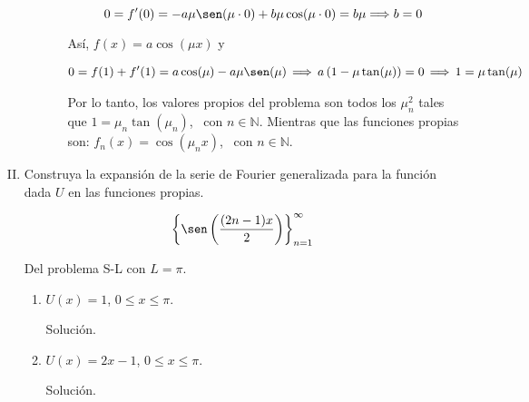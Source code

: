\documentclass[fleqn]{article}
\newcommand{\nat}{\mathbb{N}}
\begin{document}
\begin{enumerate}[I.]
\begin{enumerate}
\begin{enumerate}[i)]
				\begin{equation*}
					0 = f'(0) = -a \mu \sen(\mu \cdot 0) + b \mu \cos(\mu \cdot 0) = b \mu \Longrightarrow b = 0
				\end{equation*}

				Así, $ f(x) = a \cos(\mu x) $ y 

				\begin{align*}
					0 = f(1) + f'(1) = a \cos(\mu) - a \mu \sen(\mu) \, \Longrightarrow \, a \left( 1 - \mu \tan(\mu) \right) = 0 \, \Longrightarrow \, 1 = \mu \tan (\mu)
				\end{align*}
				
				Por lo tanto, los valores propios del problema son todos los $ \mu_n^2 $ tales que $ 1 = \mu_n \tan (\mu_n) $, \, con $ n \in \nat $. Mientras que las funciones propias son: $ f_n (x) = \cos(\mu_n x) $, \, con $ n \in \nat $.
			\end{enumerate}
			
		\end{enumerate}

		
		\bfseries
			
		\item Construya la expansión de la serie de Fourier generalizada para la función dada $U$ en las funciones propias.
		
		\begin{equation*}
			\left\lbrace \sen \left( \dfrac{(2n - 1) x}{2} \right) \right\rbrace_{n=1}^{\infty}
		\end{equation*}

		Del problema S-L con $ L = \pi $.
		
		\begin{enumerate}
			\item $ U(x) = 1 $, $ 0 \leq x \leq \pi $.
			
			Solución.
			
			\normalfont




			\bfseries
			
			\item $ U(x) = 2x - 1 $, $ 0 \leq x \leq \pi $.
			
			Solución.
			
			\normalfont




\end{enumerate}
\end{enumerate}
\end{document}
